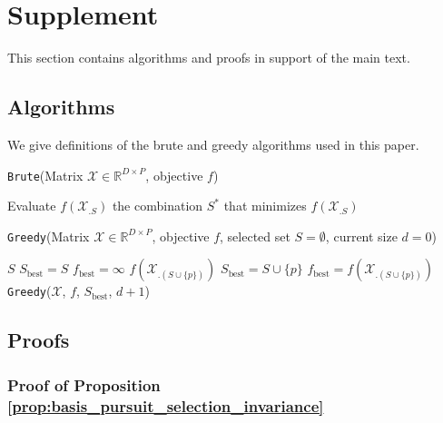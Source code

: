 \section{Supplement}

This section contains algorithms and proofs in support of the main text.

\subsection{Algorithms}
\label{sec:algorithms}

We give definitions of the brute and greedy algorithms used in this paper.

\begin{algorithm}[H]
\caption{\texttt{Brute}(Matrix $\mathcal{X} \in \mathbb{R}^{D \times P}$, objective $f$)}
\begin{algorithmic}[1]
    \STATE Evaluate $f(\mathcal{X}_{.S})$
\ENDFOR
{} the combination $S^*$ that minimizes $f(\mathcal{X}_{.S})$
\end{algorithmic}
\end{algorithm}

\begin{algorithm}[H]
\caption{\texttt{Greedy}(Matrix $\mathcal{X} \in \mathbb{R}^{D \times P}$, objective $f$, selected set $S = \emptyset$, current size $d=0$)}
\begin{algorithmic}[1]
     $S$
\ELSE
     $S_{\text{best}} = S$
     $f_{\text{best}} = \infty$
         $f(\mathcal{X}_{.(S \cup \{p\})})$
             $S_{\text{best}} = S \cup \{p\}$
             $f_{\text{best}} = f(\mathcal{X}_{.(S \cup \{p\})})$
        \ENDIF
    \ENDFOR
     \texttt{Greedy}($\mathcal{X}$, $f$, $S_{\text{best}}$, $d+1$)
\ENDIF
\end{algorithmic}
\end{algorithm}

\subsection{Proofs}
\label{sec:proofs}

\subsubsection{Proof of Proposition \ref{prop:basis_pursuit_selection_invariance}}
\label{proof:basis_pursuit_program_invariance}

